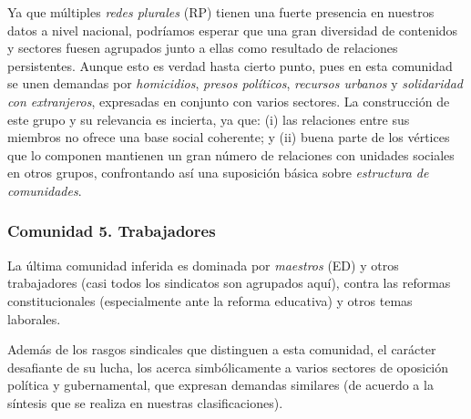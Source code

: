 \documentclass[letterpaper, 11pt]{book}
\theoremstyle{definition}
\theoremstyle{remark}
\begin{document}
Ya que múltiples \emph{redes plurales} (RP) tienen una fuerte presencia en nuestros datos a nivel nacional, podríamos esperar que una gran diversidad de contenidos y sectores fuesen agrupados junto a ellas como resultado de relaciones persistentes. 
Aunque esto es verdad hasta cierto punto, pues en esta comunidad se unen demandas por \emph{homicidios}, \emph{presos políticos}, \emph{recursos urbanos} y \emph{solidaridad con extranjeros}, expresadas en conjunto con varios sectores. 
La construcción de este grupo y su relevancia es incierta, ya que: 
(i) las relaciones entre sus miembros no ofrece una base social coherente; 
y (ii) buena parte de los vértices que lo componen mantienen un gran número de relaciones con unidades sociales en otros grupos, confrontando así una suposición básica sobre \emph{estructura de comunidades}. 


\subsubsection{Comunidad 5. Trabajadores}
\label{subsubsec3:comunidad5}

La última comunidad inferida es dominada por \emph{maestros} (ED) y otros trabajadores (casi todos los sindicatos son agrupados aquí), contra las reformas constitucionales (especialmente ante la reforma educativa) y otros temas laborales. 


Además de los rasgos sindicales que distinguen a esta comunidad, el carácter desafiante de su lucha, los acerca simbólicamente a varios sectores de oposición política y gubernamental, que expresan demandas similares (de acuerdo a la síntesis que se realiza en nuestras clasificaciones). 
\end{document}
